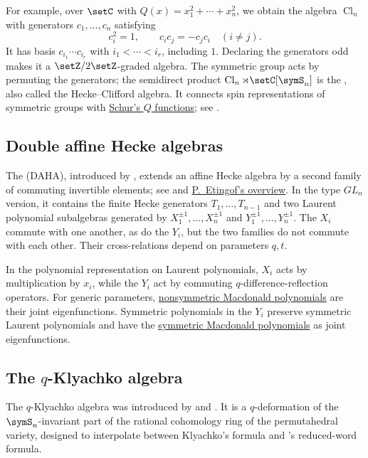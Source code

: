 For example, over $\setC$ with $Q(x)=x_1^2+\dotsb+x_n^2$, we obtain
the algebra $\operatorname{Cl}_n$ with generators $c_1,\dotsc,c_n$ satisfying
\[
 c_i^2=1,\qquad c_ic_j=-c_jc_i\quad(i\ne j).
\]
It has basis $c_{i_1}\dotsm c_{i_r}$ with $i_1<\dotsb<i_r$, including $1$.
Declaring the generators odd makes it a $\setZ/2\setZ$-graded algebra.
The symmetric group acts by permuting the generators; the semidirect product
$\operatorname{Cl}_n\rtimes\setC[\symS_n]$ is the
, also called the Hecke--Clifford algebra.
It connects spin representations of symmetric groups with
\hyperref[schurQ]{Schur's $Q$ functions}; see \cite[Secs.~2--3]{WanWang2012Spin}.

\subsection[doubleAffineHeckeAlgebra]{Double affine Hecke algebras}

The  (DAHA), introduced by
, extends an affine Hecke algebra by a second family
of commuting invertible elements; see \cite{Cherednik1995} and
\href{https://math.mit.edu/~etingof/rivercher.pdf}{P.~Etingof's overview}.
In the type $GL_n$ version, it contains the finite Hecke generators
$T_1,\dotsc,T_{n-1}$ and two Laurent polynomial subalgebras generated by
$X_1^{\pm1},\dotsc,X_n^{\pm1}$ and $Y_1^{\pm1},\dotsc,Y_n^{\pm1}$.
The $X_i$ commute with one another, as do the $Y_i$, but the two families
do not commute with each other. Their cross-relations depend on parameters
$q,t$.

In the polynomial representation on Laurent polynomials, $X_i$ acts by
multiplication by $x_i$, while the $Y_i$ act by commuting
$q$-difference-reflection operators. For generic parameters,
\hyperref[macdonaldE]{nonsymmetric Macdonald polynomials} are their joint
eigenfunctions. Symmetric polynomials in the $Y_i$ preserve symmetric
Laurent polynomials and have the
\hyperref[macdonaldP]{symmetric Macdonald polynomials} as joint eigenfunctions.

\subsection[klyachkoAlgebra]{The $q$-Klyachko algebra}

The $q$-Klyachko algebra was introduced by  and
 \cite{NadeauTewari2025QKlyachko}.  It is a
$q$-deformation of the $\symS_n$-invariant part of the rational cohomology
ring of the permutahedral variety, designed to interpolate between Klyachko's
formula and 's reduced-word formula.

